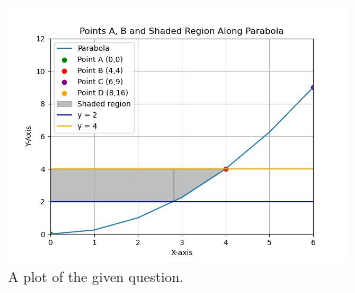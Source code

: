 \documentclass[journal]{IEEEtran}
\begin{document}
\begin{figure}[h]
	\centering
	\includegraphics[width=0.8\textwidth]{figs/fig.jpg}
	\caption{A plot of the given question.}
\end{figure}
\end{document}
